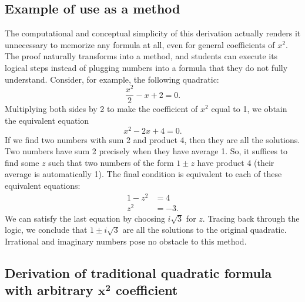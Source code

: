 \subsection{Example of use as a method}
\label{sec:example}

The computational and conceptual simplicity of this derivation actually
renders it unnecessary to memorize any formula at all, even for general
coefficients of $x^2$. The proof naturally transforms into a method, and
students can execute its logical steps instead of plugging numbers into a
formula that they do not fully understand. Consider, for example, the
following quadratic:
\begin{displaymath}
  \frac{x^2}{2} - x + 2 = 0.
\end{displaymath}
Multiplying both sides by 2 to make the coefficient of $x^2$ equal to 1, we
obtain the equivalent equation
\begin{displaymath}
  x^2 - 2x + 4 = 0.
\end{displaymath}
If we find two numbers with sum 2 and product 4, then they are all the
solutions. Two numbers have sum 2 precisely when they have average 1.  So, it
suffices to find some $z$ such that two numbers of the form $1 \pm z$ have
product 4 (their average is automatically 1). The final condition is equivalent
to each of these equivalent equations:
\begin{align*}
  1 - z^2 &= 4 \\
  z^2 &= -3.
\end{align*}
We can satisfy the last equation by choosing $i \sqrt{3}$ for $z$. Tracing back
through the logic, we conclude that $1 \pm i \sqrt{3}$ are all the solutions to
the original quadratic. Irrational and imaginary numbers pose no obstacle to
this method.


\subsection{Derivation of traditional quadratic formula with arbitrary
  $\boldsymbol{x^2}$ coefficient}

